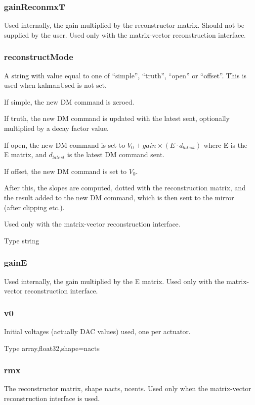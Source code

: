 \documentclass[a4,10pt]{article}
\begin{document}
\subsubsection{gainReconmxT}
Used internally, the gain multiplied by the reconstructor matrix.
Should not be supplied by the user.  Used only with the matrix-vector
reconstruction interface.

\subsubsection{reconstructMode}
A string with value equal to one of ``simple'', ``truth'', ``open'' or
``offset''.  This is used when kalmanUsed is not set.

If simple, the new DM command is zeroed.  

If truth, the new DM command is updated with the latest sent,
optionally multiplied by a decay factor value.

If open, the new DM command is set to $V_0 + gain \times (E \cdot
d_{latest})$ where E is the E matrix, and $d_{latest}$ is the latest DM
command sent.

If offset, the new DM command is set to $V_0$.

After this, the slopes are computed, dotted with the reconstruction
matrix, and the result added to the new DM command, which is then sent
to the mirror (after clipping etc.).

Used only with the matrix-vector
reconstruction interface.

Type string

\subsubsection{gainE}
Used internally, the gain multiplied by the E matrix.  Used only with the matrix-vector
reconstruction interface.

\subsubsection{v0}
Initial voltages (actually DAC values) used, one per actuator.

Type array,float32,shape=nacts

\subsubsection{rmx}
The reconstructor matrix, shape nacts, ncents.  Used only when the
matrix-vector reconstruction interface is used.
\end{document}
